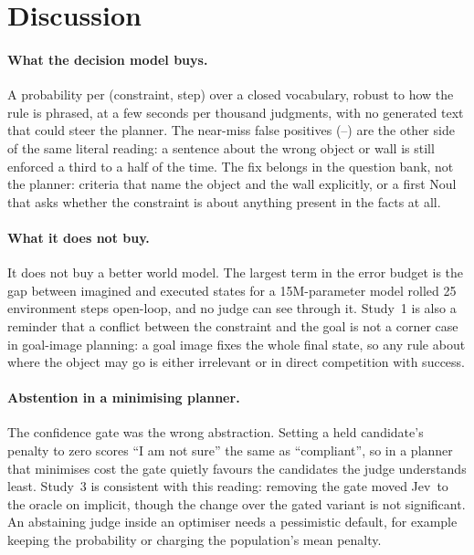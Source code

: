 \documentclass[11pt]{article}
\newcommand{\jev}{Jev}
\begin{document}
\section{Discussion}\label{sec:discussion}
\paragraph{What the decision model buys.} A probability per (constraint, step) over a closed vocabulary, robust to how the rule is phrased, at a few seconds per thousand judgments, with no generated text that could steer the planner. The near-miss false positives (--) are the other side of the same literal reading: a sentence about the wrong object or wall is still enforced a third to a half of the time. The fix belongs in the question bank, not the planner: criteria that name the object and the wall explicitly, or a first Noul that asks whether the constraint is about anything present in the facts at all.
\paragraph{What it does not buy.} It does not buy a better world model. The largest term in the error budget is the gap between imagined and executed states for a 15M-parameter model rolled 25 environment steps open-loop, and no judge can see through it. Study~1 is also a reminder that a conflict between the constraint and the goal is not a corner case in goal-image planning: a goal image fixes the whole final state, so any rule about where the object may go is either irrelevant or in direct competition with success.
\paragraph{Abstention in a minimising planner.} The confidence gate was the wrong abstraction. Setting a held candidate's penalty to zero scores ``I am not sure'' the same as ``compliant'', so in a planner that minimises cost the gate quietly favours the candidates the judge understands least. Study~3 is consistent with this reading: removing the gate moved \jev\ to the oracle on implicit, though the change over the gated variant is not significant. An abstaining judge inside an optimiser needs a pessimistic default, for example keeping the probability or charging the population's mean penalty.
\end{document}
